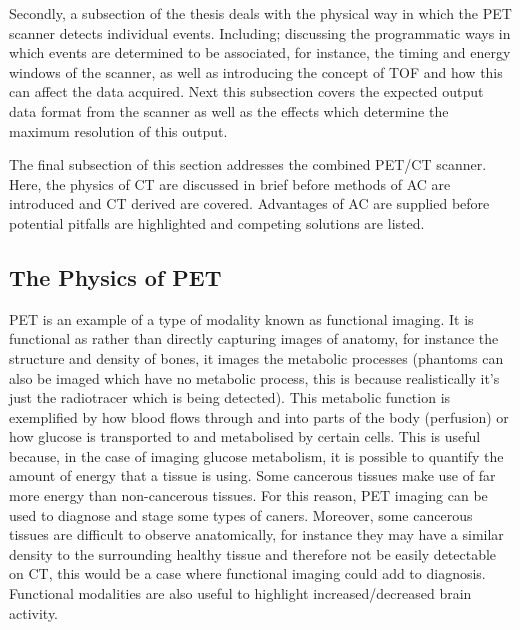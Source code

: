        Secondly, a subsection of the thesis deals with the physical way in which the \gls{PET} scanner detects individual events. Including; discussing the programmatic ways in which events are determined to be associated, for instance, the timing and energy windows of the scanner, as well as introducing the concept of \gls{TOF} and how this can affect the data acquired. Next this subsection covers the expected output data format from the scanner as well as the effects which determine the maximum resolution of this output.
        
        The final subsection of this section addresses the combined \gls{PET}/\gls{CT} scanner. Here, the physics of \gls{CT} are discussed in brief before methods of \gls{AC} are introduced and \gls{CT} derived  are covered. Advantages of \gls{AC} are supplied before potential pitfalls are highlighted and competing solutions are listed.
        
        \subsection{The Physics of PET} \label{sec:the_physics_of_pet}
            
            \gls{PET} is an example of a type of modality known as functional imaging. It is functional as rather than directly capturing images of anatomy, for instance the structure and density of bones, it images the metabolic processes (phantoms can also be imaged which have no metabolic process, this is because realistically it's just the radiotracer which is being detected). This metabolic function is exemplified by how blood flows through and into parts of the body (perfusion) or how glucose is transported to and metabolised by certain cells. This is useful because, in the case of imaging glucose metabolism, it is possible to quantify the amount of energy that a tissue is using. Some cancerous tissues make use of far more energy than non-cancerous tissues. For this reason, PET imaging can be used to diagnose and stage some types of caners. Moreover, some cancerous tissues are difficult to observe anatomically, for instance they may have a similar density to the surrounding healthy tissue and therefore not be easily detectable on \gls{CT}, this would be a case where functional imaging could add to diagnosis. Functional modalities are also useful to highlight increased/decreased brain activity.
            
